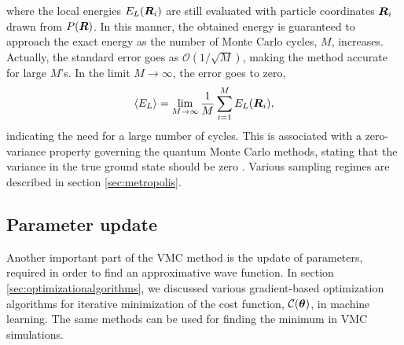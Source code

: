 where the local energies $E_L(\boldsymbol{{R}}_i)$ are still evaluated with particle coordinates $\boldsymbol{{R}}_i$ drawn from $P(\boldsymbol{{R}})$. In this manner, the obtained energy is guaranteed to approach the exact energy as the number of Monte Carlo cycles, $M$, increases. Actually, the standard error goes as $\mathcal{O}(1/\sqrt{M})$, making the method accurate for large $M$'s. In the limit $M\rightarrow\infty$, the error goes to zero,
\begin{equation}
\langle E_L\rangle=\lim_{M\to\infty} \frac{1}{M}\sum_{i=1}^ME_L(\boldsymbol{{R}}_i),
\end{equation}
indicating the need for a large number of cycles. This is associated with a zero-variance property governing the quantum Monte Carlo methods, stating that the variance in the true ground state should be zero \supercite{deb_variational_2014, assaraf_zero-variance_2003}. Various sampling regimes are described in section \ref{sec:metropolis}.

\subsection{Parameter update} \label{sec:parameterupdate}
Another important part of the VMC method is the update of parameters, required in order to find an approximative wave function. In section \ref{sec:optimizationalgorithms}, we discussed various gradient-based optimization algorithms for iterative minimization of the cost function, $\mathcal{C}(\boldsymbol{{\theta}})$, in machine learning. The same methods can be used for finding the minimum in VMC simulations.

